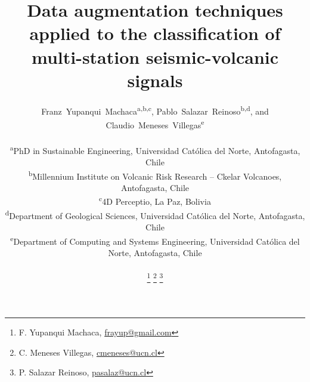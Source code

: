 \documentclass[journal]{IEEEtran}
\begin{document}
%
\title{Data augmentation techniques applied to the classification of multi-station seismic-volcanic signals}
%
%
%

\author{Franz~Yupanqui~Machaca\textsuperscript{a,b,c}, Pablo~Salazar~Reinoso\textsuperscript{b,d}, and
  Claudio~Meneses~Villegas\textsuperscript{e}\\
  \vspace{1mm}
  \begin{flushleft}
  \small\textsuperscript{a}PhD in Sustainable Engineering, Universidad Católica del Norte, Antofagasta, Chile\\
  \textsuperscript{b}Millennium Institute on Volcanic Risk Research – Ckelar Volcanoes, Antofagasta, Chile\\
  \textsuperscript{c}4D Perceptio, La Paz, Bolivia\\
  \textsuperscript{d}Department of Geological Sciences, Universidad Católica del Norte, Antofagasta, Chile\\
  \textsuperscript{e}Department of Computing and Systems Engineering, Universidad Católica del Norte, Antofagasta, Chile\\
  \end{flushleft}
  \thanks{F. Yupanqui Machaca, \color{blue}\href{mailto:frayup@gmail.com}{frayup@gmail.com} }
  \thanks{C. Meneses Villegas, \color{blue}\href{mailto:cmeneses@ucn.cl}{cmeneses@ucn.cl} }
  \thanks{P. Salazar Reinoso, \color{blue}\href{mailto:pasalaz@ucn.cl}{pasalaz@ucn.cl} }
}
\end{document}
